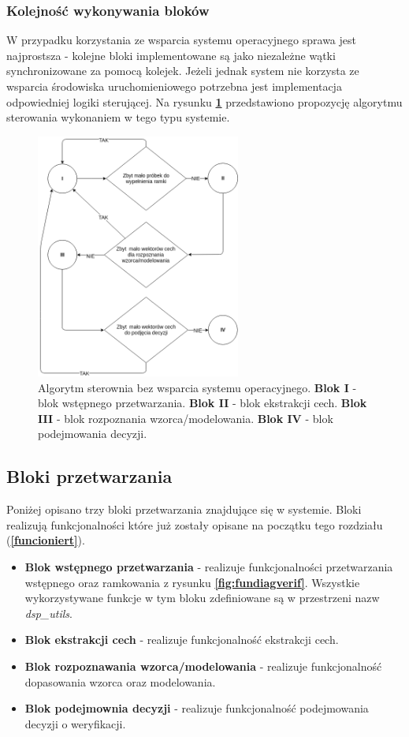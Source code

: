 \subsubsection{Kolejność wykonywania bloków}

W przypadku korzystania ze wsparcia systemu operacyjnego sprawa jest najprostsza - kolejne bloki implementowane są jako niezależne wątki synchronizowane za pomocą kolejek. Jeżeli jednak system nie korzysta ze wsparcia środowiska uruchomieniowego potrzebna jest implementacja odpowiedniej logiki sterującej. Na rysunku \textbf{\ref{fig:logics}} przedstawiono propozycję algorytmu sterowania wykonaniem w tego typu systemie.

\begin{figure}[ht!]
  \centering
    \includegraphics[width=0.6\textwidth]{./logic.png}
    \caption{\label{fig:logics} Algorytm sterownia bez wsparcia systemu operacyjnego. \textbf{Blok I} - blok wstępnego przetwarzania. \textbf{Blok II} - blok ekstrakcji cech. \textbf{Blok III} - blok rozpoznania wzorca/modelowania. \textbf{Blok IV} - blok podejmowania decyzji.}
\end{figure}

\subsection{Bloki przetwarzania}
Poniżej opisano trzy bloki przetwarzania znajdujące się w systemie. Bloki realizują funkcjonalności które już zostały opisane na początku tego rozdziału (\textbf{\ref{funcioniert}}).
\begin{itemize}
\item{\textbf{Blok wstępnego przetwarzania}} - realizuje funkcjonalności przetwarzania wstępnego oraz ramkowania z rysunku \textbf{\ref{fig:fundiagverif}}. Wszystkie wykorzystywane funkcje w tym bloku zdefiniowane są w przestrzeni nazw \textit{dsp\_utils}. 
\item{\textbf{Blok ekstrakcji cech}} - realizuje funkcjonalność ekstrakcji cech. 
\item{\textbf{Blok rozpoznawania wzorca/modelowania}} - realizuje funkcjonalność dopasowania wzorca oraz modelowania.
\item{\textbf{Blok podejmownia decyzji}} - realizuje funkcjonalność podejmowania decyzji o weryfikacji.
\end{itemize}


